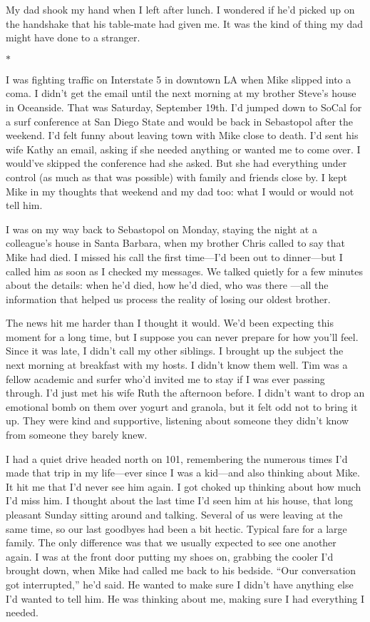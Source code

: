 \documentclass[12pt]{book}
\begin{document}
My dad shook my hand when I left after lunch. I wondered if he'd picked up on the handshake that his table-mate had given me. It was the kind of thing my dad might have done to a stranger.

\begin{center}$*$\end{center}

I was fighting traffic on Interstate 5 in downtown LA when Mike slipped into a coma. I didn't get the email until the next morning at my brother Steve's house in Oceanside. That was Saturday, September 19th. I'd jumped down to SoCal for a surf conference at San Diego State and would be back in Sebastopol after the weekend. I'd felt funny about leaving town with Mike close to death. I'd sent his wife Kathy an email, asking if she needed anything or wanted me to come over. I would've skipped the conference had she asked. But she had everything under control (as much as that was possible) with family and friends close by. I kept Mike in my thoughts that weekend and my dad too: what I would or would not tell him.

I was on my way back to Sebastopol on Monday, staying the night at a colleague's house in Santa Barbara, when my brother Chris called to say that Mike had died. I missed his call the first time---I'd been out to dinner---but I called him as soon as I checked my messages. We talked quietly for a few minutes about the details: when he'd died, how he'd died, who was there ---all the information that helped us process the reality of losing our oldest brother.

The news hit me harder than I thought it would. We'd been expecting this moment for a long time, but I suppose you can never prepare for how you'll feel. Since it was late, I didn't call my other siblings. I brought up the subject the next morning at breakfast with my hosts. I didn't know them well. Tim was a fellow academic and surfer who'd invited me to stay if I was ever passing through. I'd just met his wife Ruth the afternoon before. I didn't want to drop an emotional bomb on them over yogurt and granola, but it felt odd not to bring it up. They were kind and supportive, listening about someone they didn't know from someone they barely knew.

I had a quiet drive headed north on 101, remembering the numerous times I'd made that trip in my life---ever since I was a kid---and also thinking about Mike. It hit me that I'd never see him again. I got choked up thinking about how much I'd miss him. I thought about the last time I'd seen him at his house, that long pleasant Sunday sitting around and talking. Several of us were leaving at the same time, so our last goodbyes had been a bit hectic. Typical fare for a large family. The only difference was that we usually expected to see one another again. I was at the front door putting my shoes on, grabbing the cooler I'd brought down, when Mike had called me back to his bedside. ``Our conversation got interrupted,'' he'd said. He wanted to make sure I didn't have anything else I'd wanted to tell him. He was thinking about me, making sure I had everything I needed.
\end{document}
